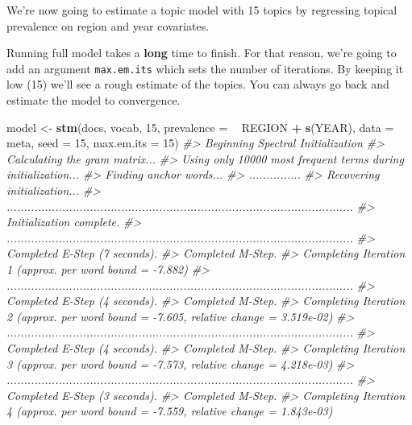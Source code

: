 \documentclass[]{book}
\newenvironment{Shaded}{\begin{snugshade}}{\end{snugshade}}
\newcommand{\CommentTok}[1]{\textcolor[rgb]{0.56,0.35,0.01}{\textit{#1}}}
\newcommand{\DataTypeTok}[1]{\textcolor[rgb]{0.13,0.29,0.53}{#1}}
\newcommand{\DecValTok}[1]{\textcolor[rgb]{0.00,0.00,0.81}{#1}}
\newcommand{\KeywordTok}[1]{\textcolor[rgb]{0.13,0.29,0.53}{\textbf{#1}}}
\newcommand{\NormalTok}[1]{#1}
\newcommand{\OperatorTok}[1]{\textcolor[rgb]{0.81,0.36,0.00}{\textbf{#1}}}
\newcommand{\StringTok}[1]{\textcolor[rgb]{0.31,0.60,0.02}{#1}}
\begin{document}
We're now going to estimate a topic model with 15 topics by regressing topical prevalence on region and year covariates.

Running full model takes a \textbf{long} time to finish. For that reason, we're going to add an argument \texttt{max.em.its} which sets the number of iterations. By keeping it low (15) we'll see a rough estimate of the topics. You can always go back and estimate the model to convergence.

\begin{Shaded}
\begin{Highlighting}[]
\NormalTok{model <-}\StringTok{ }\KeywordTok{stm}\NormalTok{(docs, vocab, }\DecValTok{15}\NormalTok{, }\DataTypeTok{prevalence =} \OperatorTok{~}\StringTok{ }\NormalTok{REGION }\OperatorTok{+}\StringTok{ }\KeywordTok{s}\NormalTok{(YEAR), }\DataTypeTok{data =}\NormalTok{ meta, }\DataTypeTok{seed =} \DecValTok{15}\NormalTok{, }\DataTypeTok{max.em.its =} \DecValTok{15}\NormalTok{)}
\CommentTok{#> Beginning Spectral Initialization }
\CommentTok{#>   Calculating the gram matrix...}
\CommentTok{#>   Using only 10000 most frequent terms during initialization...}
\CommentTok{#>   Finding anchor words...}
\CommentTok{#>      ...............}
\CommentTok{#>   Recovering initialization...}
\CommentTok{#>      ....................................................................................................}
\CommentTok{#> Initialization complete.}
\CommentTok{#> ....................................................................................................}
\CommentTok{#> Completed E-Step (7 seconds). }
\CommentTok{#> Completed M-Step. }
\CommentTok{#> Completing Iteration 1 (approx. per word bound = -7.882) }
\CommentTok{#> ....................................................................................................}
\CommentTok{#> Completed E-Step (4 seconds). }
\CommentTok{#> Completed M-Step. }
\CommentTok{#> Completing Iteration 2 (approx. per word bound = -7.605, relative change = 3.519e-02) }
\CommentTok{#> ....................................................................................................}
\CommentTok{#> Completed E-Step (4 seconds). }
\CommentTok{#> Completed M-Step. }
\CommentTok{#> Completing Iteration 3 (approx. per word bound = -7.573, relative change = 4.218e-03) }
\CommentTok{#> ....................................................................................................}
\CommentTok{#> Completed E-Step (3 seconds). }
\CommentTok{#> Completed M-Step. }
\CommentTok{#> Completing Iteration 4 (approx. per word bound = -7.559, relative change = 1.843e-03) }

\end{Highlighting}
\end{Shaded}
\end{document}
